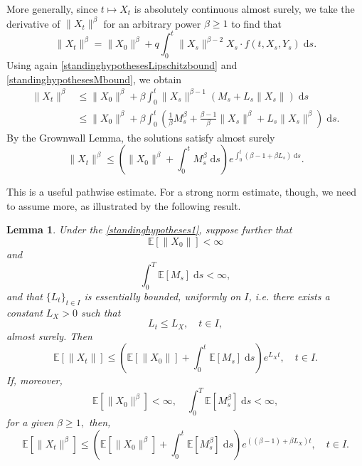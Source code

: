 \documentclass[reqno,12pt]{amsart}
\theoremstyle{plain} %
\newtheorem{lemma}{Lemma}[section]
\theoremstyle{definition} %
\begin{document}
More generally, since $t\mapsto X_t$ is absolutely continuous almost surely, we take the derivative of $\|X_t\|^\beta$ for an arbitrary power $\beta \geq 1$ to find that
\[
    \|X_t\|^\beta = \|X_0\|^\beta + q\int_0^t \|X_s\|^{\beta-2}X_s \cdot f(t, X_s, Y_s)\;\mathrm{d}s.
\]
Using again \eqref{standinghypothesesLipschitzbound} and \eqref{standinghypothesesMbound}, we obtain
\begin{align*}
    \|X_t\|^\beta & \leq \|X_0\|^\beta + \beta\int_0^t \|X_s\|^{\beta-1} \left(M_s + L_s \|X_s\|\right)\;\mathrm{d}s \\
    & \leq \|X_0\|^\beta + \beta\int_0^t \left(\frac{1}{\beta}M_s^\beta + \frac{\beta-1}{\beta}\|X_s\|^\beta + L_s \|X_s\|^\beta\right)\;\mathrm{d}s.
\end{align*}
By the Grownwall Lemma, the solutions satisfy almost surely
\begin{equation}
    \label{XtboundLXMtbeta}
    \|X_t\|^\beta \leq \left(\|X_0\|^\beta + \int_0^t M_s^\beta \;\mathrm{d}s\right) e^{\int_0^t \left(\beta - 1 + \beta L_s\right) \;\mathrm{d}s}.
\end{equation}

This is a useful pathwise estimate. For a strong norm estimate, though, we need to assume more, as illustrated by the following result.
\begin{lemma}
    Under the \cref{standinghypotheses1}, suppose further that
    \begin{equation}
        \label{EX0strongbound}
        \mathbb{E}[\|X_0\|] < \infty
    \end{equation}
    and
    \begin{equation}
        \label{EMtstrongbound}
        \int_0^T \mathbb{E}[M_s] \;\mathrm{d}s < \infty,
    \end{equation}
    and that $\{L_t\}_{t\in I}$ is essentially bounded, uniformly on $I$, i.e. there exists a constant $L_X > 0$ such that
    \begin{equation}
        \label{LtLXbound}
        L_t \leq L_X, \quad  t\in I,
    \end{equation}
    almost surely. Then
    \begin{equation}
        \label{EXtstrongbound}
        \mathbb{E}[\|X_t\|] \leq \left(\mathbb{E}[\|X_0\|] + \int_0^t \mathbb{E}[M_s]\;\mathrm{d}s\right) e^{L_X t}, \quad t\in I.
    \end{equation}
    If, moreover,
    \begin{equation}
        \label{EX0Mtstrongboundbeta}
        \mathbb{E}[\|X_0\|^\beta] < \infty, \quad
        \int_0^T \mathbb{E}[M_s^\beta] \;\mathrm{d}s < \infty,
    \end{equation}
    for a given $\beta \geq 1,$ then,
    \begin{equation}
        \label{EXtstrongboundbeta}
        \mathbb{E}[\|X_t\|^\beta] \leq \left(\mathbb{E}[\|X_0\|^\beta] + \int_0^t \mathbb{E}[M_s^\beta]\;\mathrm{d}s\right) e^{((\beta - 1) + \beta L_X) t}, \quad t\in I.
    \end{equation}
\end{lemma}
\end{document}
